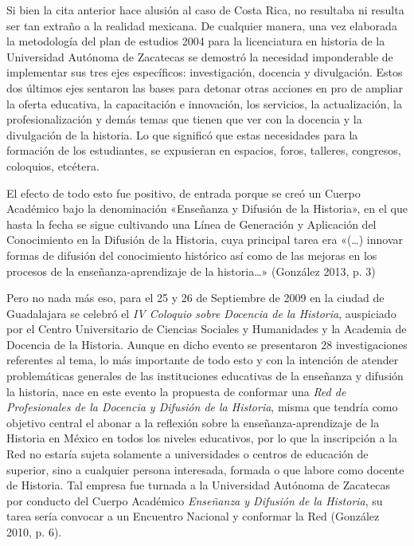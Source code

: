\bigskip
Si bien la cita anterior hace alusión al caso de Costa Rica, no resultaba ni
resulta ser tan extraño a la realidad mexicana. De cualquier manera, una vez
elaborada la metodología del plan de estudios 2004 para la licenciatura en
historia de la Universidad Autónoma de Zacatecas se demostró la necesidad
imponderable de implementar sus tres ejes específicos: investigación, docencia
y divulgación. Estos dos últimos ejes sentaron las bases para detonar otras
acciones en pro de ampliar la oferta educativa, la capacitación e innovación,
los servicios, la actualización, la profesionalización y demás temas que tienen que
ver con la docencia y la divulgación de la historia. Lo que significó que estas
necesidades para la formación de los estudiantes, se expusieran en espacios, foros,
talleres, congresos, coloquios, etcétera.

El efecto de todo esto fue positivo, de entrada porque se creó un Cuerpo
Académico bajo la denominación «Enseñanza y Difusión de la Historia», en el que
hasta la fecha se sigue cultivando una Línea de Generación y Aplicación del
Conocimiento en la Difusión de la Historia, cuya principal tarea era 
«(\ldots{}) innovar
formas de difusión del conocimiento histórico así como de las mejoras en los
procesos de la enseñanza-aprendizaje de la historia\ldots » (González 2013, p. 3)

Pero no nada más eso, para el 25 y 26 de Septiembre de 2009 en la ciudad de
Guadalajara se celebró el \textit{IV Coloquio sobre Docencia de la Historia},
 auspiciado por el Centro Universitario de Ciencias Sociales y Humanidades y la
Academia de Docencia de la Historia. Aunque en dicho evento se presentaron 28
investigaciones referentes al tema, lo más importante de todo esto y con la
intención de atender  problemáticas generales de las instituciones educativas
de la enseñanza y difusión la historia, nace en este evento la propuesta de 
conformar una \textit{Red de Profesionales de la Docencia y
Difusión de la Historia}, misma que tendría como objetivo central el abonar a
la reflexión sobre la enseñanza-aprendizaje de la Historia en México en todos
los niveles educativos, por lo que la inscripción a la Red no estaría sujeta
solamente a universidades o centros de educación de superior, sino a cualquier
persona interesada, formada o que labore como docente de Historia. Tal empresa
fue turnada a la Universidad Autónoma de Zacatecas por conducto del Cuerpo
Académico \textit{Enseñanza y Difusión de la Historia}, su tarea sería convocar
a un Encuentro Nacional y conformar la Red (González 2010, p. 6).


